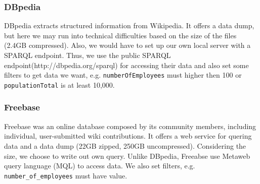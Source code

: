 \subsubsection{DBpedia}
DBpedia extracts structured information from Wikipedia. It offers a data dump, but here we may run into technical difficulties based on the size of the files (2.4GB compressed). Also, we would have to set up our own local server with a SPARQL endpoint. Thus, we use the public SPARQL endpoint(http://dbpedia.org/sparql) for accessing their data and also set some filters to get data we want, e.g. \texttt{numberOfEmployees} must higher then 100 or \texttt{populationTotal} is at least 10,000.
\subsubsection{Freebase}
Freebase was an online database composed by its community members, including individual, user-submitted wiki contributions. It offers a web service for quering data and a data dump (22GB zipped, 250GB uncompressed). Considering the size, we choose to write out own query. Unlike DBpedia, Freeabse use Metaweb query language (MQL) to access data. We also set filters, e.g. \texttt{number\_of\_employees} must have value.